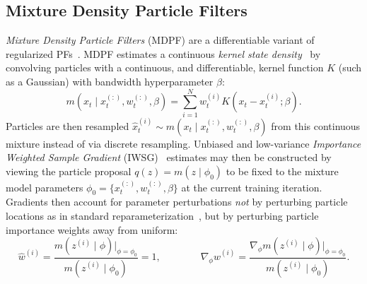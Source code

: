     \subsection{Mixture Density Particle Filters}
    \label{sec:mdpf}
    \emph{Mixture Density Particle Filters} (MDPF) \cite{younis2023mdpf} are a differentiable variant of regularized PFs~\cite{859873, musso01}. MDPF estimates a continuous \emph{kernel state density}~\cite{Silverman86} by convolving particles with a continuous, and differentiable, kernel function $K$ (such as a Gaussian) with bandwidth hyperparameter $\beta$:
        \begin{equation}    
            m(x_t \mid x_t^{(:)}, w_t^{(:)}, \beta) = \sum_{i=1}^N  w_t^{(i)} K(x_t - x_t^{(i)}; \beta).
            \label{eqn:regularized_pf_density}
        \end{equation}
        Particles are then resampled $\hat{x}^{(i)}_{t}\sim m(x_t \mid x_t^{(:)}, w_t^{(:)}, \beta)$ from this continuous mixture instead of via discrete resampling.  Unbiased and low-variance \emph{Importance Weighted Sample Gradient} (IWSG)~\cite{younis2023mdpf} estimates may then be constructed by viewing the particle proposal $q(z) = m(z \mid \phi_{0})$ to be fixed to the mixture model parameters $\phi_0 = \{ x_t^{(:)}, w_t^{(:)}, \beta\}$ at the current training iteration.  Gradients then account for parameter perturbations \emph{not} by perturbing particle locations as in standard reparameterization~\cite{mnih14amortized,kingma14,rezende14vae}, but by perturbing particle importance weights away from uniform:
        \begin{equation}
            \hat{w}^{(i)} = \frac{m(z^{(i)} \mid \phi)\big\rvert_{\phi=\phi_0}}{m(z^{(i)} \mid \phi_0)} = 1, \qquad\qquad
            \nabla_{\phi} \hat{w}^{(i)} = \frac{\nabla_{\phi }m(z^{(i)} \mid \phi) \big\rvert_{\phi=\phi_0}}{m(z^{(i)} \mid \phi_0)}.
            \label{eqn:iwsg_2}
        \end{equation}
